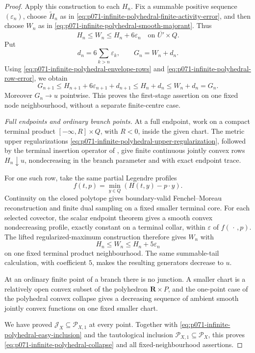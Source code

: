 \begin{proof}
Apply this construction to each \(H_n\).  Fix a summable positive sequence
\((\varepsilon_n)\), choose \(\widetilde H_n\) as in
\eqref{eq:p071-infinite-polyhedral-finite-activity-error}, and then choose
\(W_n\) as in
\eqref{eq:p071-infinite-polyhedral-smooth-majorant}.  Thus
\begin{equation}
                    H_n\leq W_n\leq H_n+6\varepsilon_n
                    \quad\text{on }\overline{U'}\times Q.
 \label{eq:p071-infinite-polyhedral-row-error}
\end{equation}
Put
\[
             d_n=6\sum_{k>n}\varepsilon_k,\qquad G_n=W_n+d_n.
\]
Using \eqref{eq:p071-infinite-polyhedral-envelope-rows} and
\eqref{eq:p071-infinite-polyhedral-row-error}, we obtain
\[
 G_{n+1}\leq H_{n+1}+6\varepsilon_{n+1}+d_{n+1}
       \leq H_n+d_n\leq W_n+d_n=G_n.
\]
Moreover \(G_n\to u\) pointwise.  This proves the first-stage assertion on
one fixed node neighbourhood, without a separate finite-centre case.

\medskip\noindent
\emph{Full endpoints and ordinary branch points.}
At a full endpoint, work on a compact terminal product
\([-\infty,R]\times Q\), with \(R<0\), inside the given chart.  The metric
upper regularizations
\eqref{eq:p071-infinite-polyhedral-upper-regularization}, followed by the
terminal insertion operator of
, give finite continuous
jointly convex rows \(H_n\downarrow u\), nondecreasing in the branch
parameter and with exact endpoint trace.

For one such row, take the same partial Legendre profiles
\[
                 f(t,p)=\min_{y\in Q}(H(t,y)-p\mathbin\cdot y).
\]
Continuity on the closed polytope gives boundary-valid Fenchel--Moreau
reconstruction and finite dual sampling on a fixed smaller terminal core.
For each selected covector, the scalar endpoint theorem gives a smooth
convex nondecreasing profile, exactly constant on a terminal collar, within
\(\varepsilon\) of \(f(\,\cdot\,,p)\).  The lifted regularized-maximum
construction therefore gives \(W_n\) with
\[
                         H_n\leq W_n\leq H_n+5\varepsilon_n
\]
on one fixed terminal product neighbourhood.  The same summable-tail
calculation, with coefficient \(5\), makes the resulting
generators decrease to \(u\).

At an ordinary finite point of a branch there is no junction.  A smaller
chart is a relatively open convex subset of the polyhedron
\(\mathbf R\times P\), and the one-point case of the polyhedral convex
collapse gives a decreasing sequence of ambient smooth jointly convex
functions on one fixed smaller chart.

We have proved
\(\mathcal J_X\subseteq\mathcal P_{X,1}\) at every point.  Together with
\eqref{eq:p071-infinite-polyhedral-easy-inclusion} and the tautological
inclusion
\(\mathcal P_{X,1}\subseteq\mathcal P_X\), this proves
\eqref{eq:p071-infinite-polyhedral-collapse} and all fixed-neighbourhood
assertions.
\end{proof}
